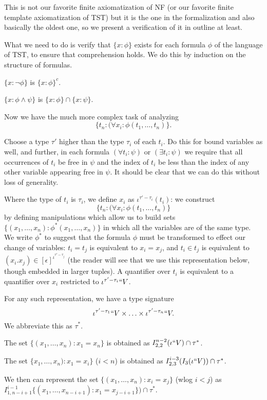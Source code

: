 \documentclass[112pt]{article}
\begin{document}
This is not our favorite finite axiomatization of NF (or our favorite finite template axiomatization of TST) but it is the one in the formalization and also basically the oldest one, so we present a verification of it in outline at least.

What we need to do is verify that $\{x:\phi\}$ exists for each formula $\phi$ of the language of TST, to ensure that comprehension holds.  We do this by induction on the structure of formulas.

$\{x:\neg \phi\}$ is $\{x :\phi\}^c$.

$\{x :\phi \wedge \psi\}$ is $\{x:\phi \} \cap \{x:\psi\}$.

Now we have the much more complex task of analyzing $$\{t_{n}:(\forall x_i:\phi(t_1,\ldots,t_n)\}.$$

Choose a type $\tau'$ higher than the type $\tau_i$ of each $t_i$.  Do this for bound variables
as well, and further, in each formula $(\forall t_i:\psi)$ or $(\exists t_i:\psi)$ we require that all occurrences of $t_i$ be free in $\psi$ and the index of $t_i$ be less than the index
of any other variable appearing free in $\psi$.  It should be clear that we can do this without loss of generality.

Where the type of $t_i$ is $\tau_i$, we define $x_i$ as $\iota^{\tau'-\tau_i}(t_i)$:  we construct $$\{t_{n}:(\forall x_i:\phi(t_1,\ldots,t_n)\}$$ by defining manipulations which allow us to build sets $\{(x_1,\ldots,x_n):\phi^*(x_1,\ldots,x_n)\}$ in which
all the variables are of the same type.  We write $\phi^*$ to suggest that the formula $\phi$ must be transformed to effect our change of variables:  $t_i = t_j$ is equivalent to $x_i = x_j$, and $t_i \in t_j$ is equivalent to $(x_i.x_j) \in [\epsilon]^{\iota^{\tau'-\tau_j}}$ (the reader will see that we use this representation below, though embedded in larger tuples).  A quantifier over $t_i$ is equivalent to a quantifier over $x_i$ restricted to $\iota^{\tau'-\tau_i}``V$.

For any such representation, we have a type signature $$\iota^{\tau'-\tau_1}``V \times \ldots \times \iota^{\tau'-\tau_n}``V.$$  We abbreviate this as $\tau^*$.

The set $\{(x_1,\ldots,x_n):x_1 = x_n\}$ is obtained as $I_{2,2}^{n-2}(\iota``V)\cap \tau^*$.

The set $\{x_1,\dots,x_n):x_1 = x_i\}$ ($i<n$) is obtained as $I_{2,3}^{i-3}(I_3(\iota``V))\cap \tau^*$.

We then can represent the
set $\{(x_1,\ldots,x_n):x_i = x_j\}$ (wlog $i<j$) as \newline $I_{1,n-i+1}^{i-1}\{(x_1,\ldots,x_{n-i+1}):x_1 = x_{j-i+1}\})\cap \tau^*$.
\end{document}

